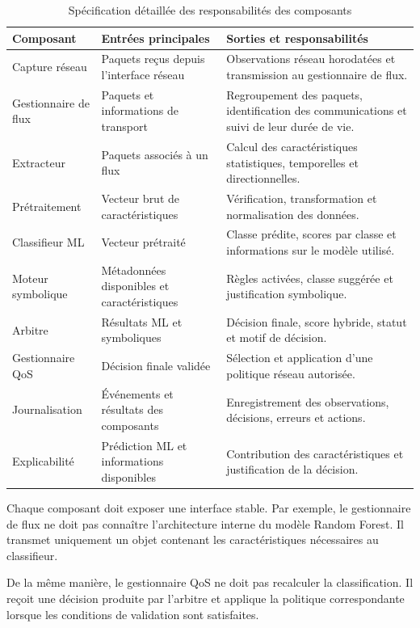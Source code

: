 \begin{table}[H]
\centering
\caption{Spécification détaillée des responsabilités des composants}
\label{tab:responsabilites_detaillees}
\small
\begin{tabularx}{\textwidth}{|l|X|X|}
\hline
\textbf{Composant} & \textbf{Entrées principales} & \textbf{Sorties et responsabilités} \\
\hline
Capture réseau &
Paquets reçus depuis l'interface réseau &
Observations réseau horodatées et transmission au gestionnaire de flux. \\
\hline
Gestionnaire de flux &
Paquets et informations de transport &
Regroupement des paquets, identification des communications et suivi de leur durée de vie. \\
\hline
Extracteur &
Paquets associés à un flux &
Calcul des caractéristiques statistiques, temporelles et directionnelles. \\
\hline
Prétraitement &
Vecteur brut de caractéristiques &
Vérification, transformation et normalisation des données. \\
\hline
Classifieur ML &
Vecteur prétraité &
Classe prédite, scores par classe et informations sur le modèle utilisé. \\
\hline
Moteur symbolique &
Métadonnées disponibles et caractéristiques &
Règles activées, classe suggérée et justification symbolique. \\
\hline
Arbitre &
Résultats ML et symboliques &
Décision finale, score hybride, statut et motif de décision. \\
\hline
Gestionnaire QoS &
Décision finale validée &
Sélection et application d'une politique réseau autorisée. \\
\hline
Journalisation &
Événements et résultats des composants &
Enregistrement des observations, décisions, erreurs et actions. \\
\hline
Explicabilité &
Prédiction ML et informations disponibles &
Contribution des caractéristiques et justification de la décision. \\
\hline
\end{tabularx}
\end{table}

Chaque composant doit exposer une interface stable. Par exemple, le gestionnaire de flux ne doit pas connaître l'architecture interne du modèle Random Forest. Il transmet uniquement un objet contenant les caractéristiques nécessaires au classifieur.

De la même manière, le gestionnaire QoS ne doit pas recalculer la classification. Il reçoit une décision produite par l'arbitre et applique la politique correspondante lorsque les conditions de validation sont satisfaites.

